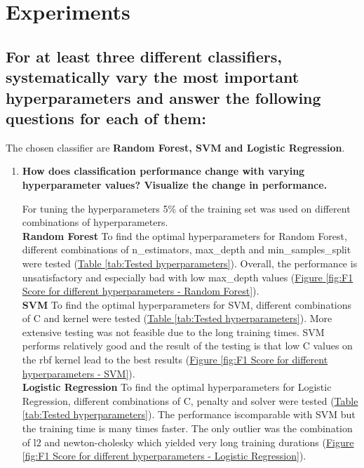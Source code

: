 
\section{Experiments}
\label{sec:Experiments}



\subsection{For at least three different classifiers, systematically vary the most important hyperparameters and answer the following questions for each of them: }
\label{sec:Experiments:a}

The chosen classifier are \textbf{Random Forest, SVM and Logistic Regression}.

\begin{enumerate}[label=\roman*.)]
\item \textbf{How does classification performance change with varying hyperparameter values? Visualize the
change in performance.}

For tuning the hyperparameters 5\% of the training set was used on different combinations of hyperparameters. \\

\textbf{Random Forest} \quad
To find the optimal hyperparameters for Random Forest, different combinations of n\_estimators, max\_depth and min\_samples\_split were tested (\hyperref[tab:Tested hyperparameters]{Table \ref{tab:Tested hyperparameters}}). Overall, the performance is  unsatisfactory and especially bad with low max\_depth values (\hyperref[fig:F1 Score for different hyperparameters - Random Forest]{Figure \ref*{fig:F1 Score for different hyperparameters - Random Forest}}). \\[-3pt]

\textbf{SVM} \quad
To find the optimal hyperparameters for SVM, different combinations of C and kernel  were tested (\hyperref[tab:Tested hyperparameters]{Table \ref*{tab:Tested hyperparameters}}). More extensive testing was not feasible due to the long training times. SVM performs relatively good and the result of the testing is that low C values on the rbf kernel lead to the best results (\hyperref[fig:F1 Score for different hyperparameters - SVM]{Figure \ref{fig:F1 Score for different hyperparameters - SVM}}). \\[-3pt]

\textbf{Logistic Regression} \quad
To find the optimal hyperparameters for Logistic Regression, different combinations of C, penalty and solver  were tested (\hyperref[tab:Tested hyperparameters]{Table \ref{tab:Tested hyperparameters}}). The performance iscomparable with SVM but the training time is many times faster. The only outlier was the combination of l2 and newton-cholesky which yielded very long training durations (\hyperref[fig:F1 Score for different hyperparameters - Logistic Regression]{Figure \ref{fig:F1 Score for different hyperparameters - Logistic Regression}}). \\


\end{enumerate}
